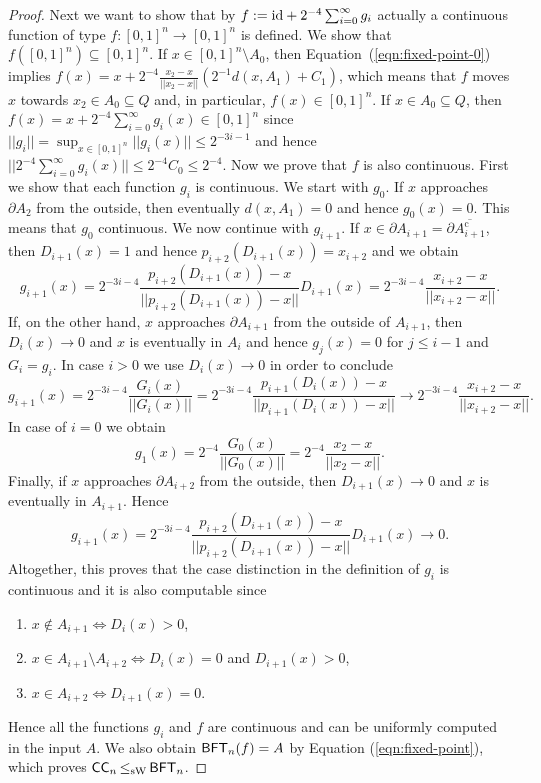 \documentclass[a4paper]{amsart}
\def\In{\subseteq}
\def\id{{\rm id}}
\def\cc{\mathrm c}
\def\BFT{\mbox{\rm\sffamily BFT}}
\def\ConC{\mbox{\rm\sffamily CC}}
\def\leqSW{\mathop{\leq_{\mathrm{sW}}}}
\theoremstyle{definition}
\begin{document}
\begin{proof}
Next we want to show that by $f:=\id+2^{-4}\sum_{i=0}^\infty g_i$ actually a continuous function of type $f:[0,1]^n\to[0,1]^n$ is defined.
We show that $f([0,1]^n)\In[0,1]^n$. If $x\in[0,1]^n\setminus A_0$, then Equation~(\ref{eqn:fixed-point-0})
implies 
$f(x)=x+2^{-4}\frac{x_2-x}{||x_2-x||}(2^{-1}d(x,A_1)+C_1)$, which means that $f$ moves $x$ 
towards $x_2\in A_0\In Q$ and, in particular, $f(x)\in[0,1]^n$.
If $x\in A_0\In Q$, then $f(x)=x+2^{-4}\sum_{i=0}^\infty g_i(x)\in[0,1]^n$ since  
$||g_i||=\sup_{x\in[0,1]^n}||g_i(x)||\leq2^{-3i-1}$ and hence $||2^{-4}\sum_{i=0}^\infty g_i(x)||\leq2^{-4}C_0\leq2^{-4}$.
Now we prove that $f$ is also continuous.
First we show that each function $g_{i}$ is continuous. We start with $g_0$. 
If $x$ approaches $\partial A_2$ from the outside, then eventually $d(x,A_1)=0$ and hence $g_0(x)=0$. 
This means that $g_0$ continuous. We now continue with $g_{i+1}$.
If $x\in\partial A_{i+1}=\partial\overline{A_{i+1}^\cc}$,
then $D_{i+1}(x)=1$ and hence $p_{i+2}(D_{i+1}(x))=x_{i+2}$ and we obtain
\[g_{i+1}(x)=2^{-3i-4}\frac{\displaystyle p_{i+2}(D_{i+1}(x))-x}{\displaystyle||p_{i+2}(D_{i+1}(x))-x||}D_{i+1}(x)=2^{-3i-4}\frac{\displaystyle x_{i+2}-x}{\displaystyle||x_{i+2}-x||}.\]
If, on the other hand, $x$ approaches $\partial A_{i+1}$ from the outside of $A_{i+1}$, then $D_i(x)\to 0$ and $x$ is eventually in 
$A_{i}$ and hence $g_{j}(x)=0$ for $j\leq i-1$ and $G_i=g_i$.
In case $i>0$ we use $D_i(x)\to 0$ in order to conclude
\[g_{i+1}(x)=2^{-3i-4}\frac{\displaystyle G_{i}(x)}{\displaystyle||G_{i}(x)||}=
2^{-3i-4}\frac{\displaystyle p_{i+1}(D_{i}(x))-x}{\displaystyle||p_{i+1}(D_{i}(x))-x||}\to2^{-3i-4}\frac{\displaystyle x_{i+2}-x}{\displaystyle||x_{i+2}-x||}.\]
In case of $i=0$ we obtain
\[g_1(x)=2^{-4}\frac{\displaystyle G_{0}(x)}{\displaystyle||G_{0}(x)||}=2^{-4}\frac{x_2-x}{||x_2-x||}.\]
Finally, if $x$ approaches $\partial A_{i+2}$ from the outside, then $D_{i+1}(x)\to 0$ and $x$ is eventually in $A_{i+1}$.
Hence 
\[g_{i+1}(x)=2^{-3i-4}\frac{\displaystyle p_{i+2}(D_{i+1}(x))-x}{\displaystyle||p_{i+2}(D_{i+1}(x))-x||}D_{i+1}(x)\to0.\]
Altogether, this proves that the case distinction in the definition of $g_{i}$ is continuous and it is also computable since
\begin{enumerate}
\item $x\not\in A_{i+1}\iff D_i(x)>0$,
\item $x\in A_{i+1}\setminus A_{i+2}\iff D_i(x)=0$ and $D_{i+1}(x)>0$,
\item $x\in A_{i+2}\iff D_{i+1}(x)=0$.
\end{enumerate}
Hence all the functions $g_i$ and $f$ are continuous and can be uniformly computed in the input $A$.
We also obtain $\BFT_n(f)=A$ by Equation (\ref{eqn:fixed-point}), which proves $\ConC_n\leqSW\BFT_n$.
\end{proof}
\end{document}
